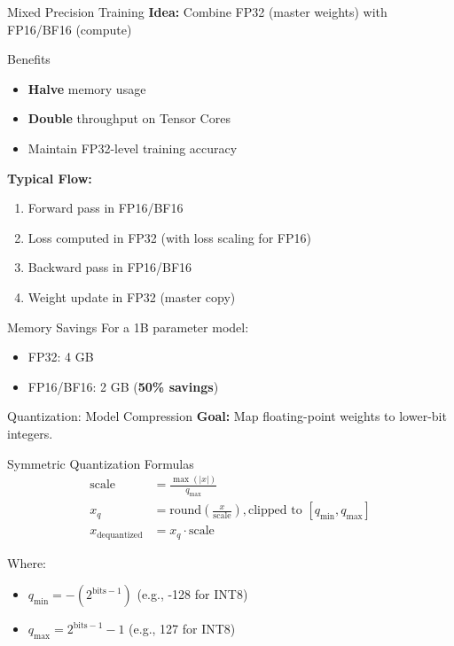 \documentclass[aspectratio=169,10pt]{beamer}
\begin{document}
\begin{frame}{Mixed Precision Training}
    \textbf{Idea:} Combine FP32 (master weights) with FP16/BF16 (compute)


    \begin{block}{Benefits}
        \begin{itemize}
            \item \textbf{Halve} memory usage
            \item \textbf{Double} throughput on Tensor Cores
            \item Maintain FP32-level training accuracy
        \end{itemize}
    \end{block}

    \textbf{Typical Flow:}
    \begin{enumerate}
        \item Forward pass in FP16/BF16
        \item Loss computed in FP32 (with loss scaling for FP16)
        \item Backward pass in FP16/BF16
        \item Weight update in FP32 (master copy)
    \end{enumerate}

    \begin{block}{Memory Savings}
        For a 1B parameter model:
        \begin{itemize}
            \item FP32: 4 GB
            \item FP16/BF16: 2 GB (\textbf{50\% savings})
        \end{itemize}
    \end{block}
\end{frame}

\begin{frame}{Quantization: Model Compression}
    \textbf{Goal:} Map floating-point weights to lower-bit integers.


    \begin{block}{Symmetric Quantization Formulas}
        \begin{align*}
            \text{scale} &= \frac{\max(|x|)}{q_{\max}} \\
            x_q &= \text{round}\left(\frac{x}{\text{scale}}\right), \text{clipped to } [q_{\min}, q_{\max}] \\
            x_{\text{dequantized}} &= x_q \cdot \text{scale}
        \end{align*}
    \end{block}


    Where:
    \begin{itemize}
        \item $q_{\min} = -(2^{\text{bits}-1})$ (e.g., -128 for INT8)
        \item $q_{\max} = 2^{\text{bits}-1} - 1$ (e.g., 127 for INT8)
    \end{itemize}

\end{frame}
\end{document}
